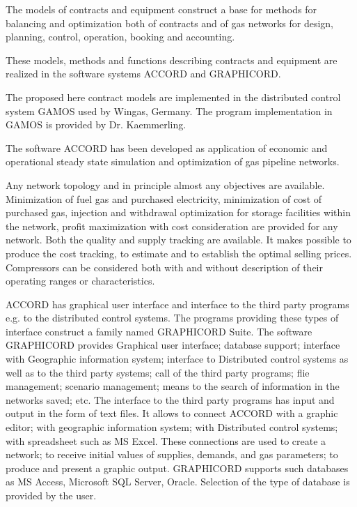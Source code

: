 \documentclass{article}
\begin{document}
The models of contracts and equipment construct a base for methods for
balancing and optimization both of contracts and of gas networks for design,
planning, control, operation, booking and accounting. \ 

These models, methods and functions describing contracts and equipment are
realized in the software systems ACCORD and GRAPHICORD.

The proposed here contract models are implemented in the distributed control
system GAMOS used by Wingas, Germany. The program implementation in GAMOS is
provided by Dr. Kaemmerling.

\bigskip

The software ACCORD has been developed as application of economic and
operational steady state simulation and optimization of gas pipeline
networks.

Any network topology and in principle almost any objectives are available.
Minimization of fuel gas and purchased electricity, minimization of cost of
purchased gas, injection and withdrawal optimization for storage facilities
within the network, profit maximization with cost consideration are provided
for any network. Both the quality and supply tracking are available. It
makes possible to produce the cost tracking, to estimate and to establish
the optimal selling prices. Compressors can be considered both with and
without description of their operating ranges or characteristics.

ACCORD has graphical user interface and interface to the third party
programs e.g. to the distributed control systems. The programs providing
these types of interface construct a family named GRAPHICORD Suite. The
software GRAPHICORD provides Graphical user interface; database support;
interface with Geographic information system; interface to Distributed
control systems as well as to the third party systems; call of the third
party programs; flie management; scenario management; means to the search of
information in the networks saved; etc. The interface to the third party
programs has input and output in the form of text files. It allows to
connect ACCORD with a graphic editor; with geographic information system;
with Distributed control systems; with spreadsheet such as MS Excel. These
connections are used to create a network; to receive initial values of
supplies, demands, and gas parameters; to produce and present a graphic
output. GRAPHICORD supports such databases as MS Access, Microsoft SQL
Server, Oracle. Selection of the type of database is provided by the user.
\end{document}
